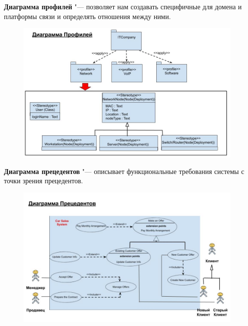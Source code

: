 \documentclass[bachelor, och, pract]{SCWorks}
\theoremstyle{remark}
\begin{document}
    \newpage
    \textbf{Диаграмма профилей} "--- позволяет нам создавать специфичные для домена и платформы связи и определять отношения между ними. 

    \begin{figure}[H]
        \begin{center}
            \includegraphics[scale=0.5]{res/profile-diagram.png}
        \end{center}
    \end{figure}


    \newpage
    \textbf{Диаграмма прецедентов} "--- описывает функциональные требования системы с точки зрения прецедентов. 
    
    \begin{figure}[H]
        \begin{center}
            \includegraphics[scale=0.5]{res/use-case-diagram.png}
        \end{center}
    \end{figure}
    
\end{document}
